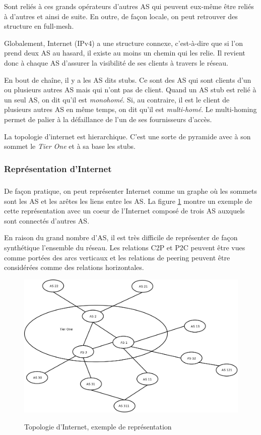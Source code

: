 \par
Sont reli\'es \`a ces grands op\'erateurs d'autres AS qui peuvent eux-m\^eme \^etre reli\'es \`a d'autres et ainsi de suite. En outre, de fa\c con locale, on peut retrouver des structure en full-mesh.
\par
Globalement, Internet (IPv4) a une structure connexe, c'est-\`a-dire que si l'on prend deux AS au hasard, il existe au moins un chemin qui les relie. Il revient donc \`a chaque AS d'assurer la visibilit\'e de ses clients \`a travers le r\'eseau.
\par
En bout de cha\^ine, il y a les AS dits stubs. Ce sont des AS qui sont clients d'un ou plusieurs autres AS mais qui n'ont pas de client. Quand un AS stub est reli\'e \`a un seul AS, on dit qu'il est \textit{monohom\'e}. Si, au contraire, il est le client de plusieurs autres AS en m\^eme temps, on dit qu'il est \textit{multi-hom\'e}. Le multi-homing permet de palier à la défaillance de l'un de ses fournisseurs d'accès.
\par
La topologie d'internet est hierarchique. C'est une sorte de pyramide avec à son sommet le \textit{Tier One} et à sa base les stubs.

\subsubsection{Repr\'esentation d'Internet}
\subparagraph{}
De fa\c con pratique, on peut repr\'esenter Internet comme un graphe o\`u les sommets sont les AS et les ar\^etes les liens entre les AS. La figure \ref{topologie} montre un exemple de cette repr\'esentation avec un coeur de l'Internet compos\'e de trois AS auxquels sont connect\'es d'autres AS.
\par
En raison du grand nombre d'AS, il est tr\`es difficile de repr\'esenter de fa\c con synth\'etique l'ensemble du r\'eseau. Les relations C2P et P2C peuvent \^etre vues comme port\'ees des arcs verticaux et les relations de peering peuvent \^etre consid\'er\'ees comme des relations horizontales.

\begin{figure}[H]
\centering
 \fbox
 {
 \includegraphics[width=16cm]{./schema/topologie_internet.png}
 }
  \caption{\label{topologie}Topologie d'Internet, exemple de repr\'esentation}
\end{figure}



%
